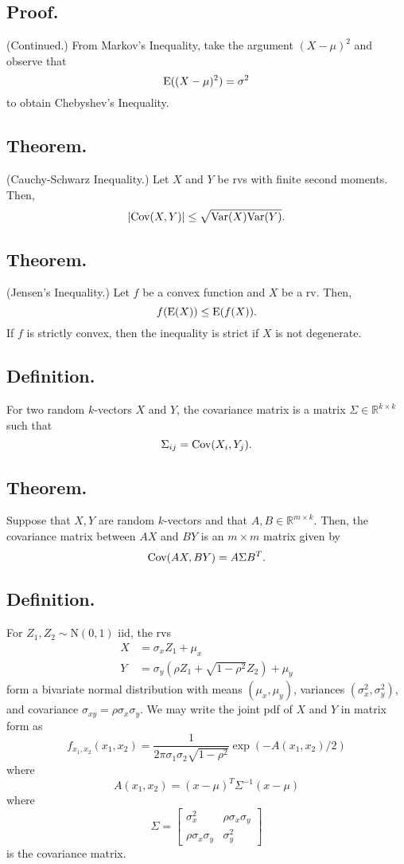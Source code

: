 \documentclass[titlepage]{article}
\begin{document}
\subsection{Proof.} (Continued.) From Markov's Inequality, take the argument $(X - \mu)^{2}$ and observe that 
$$\text{E}((X - \mu)^{2}) = \sigma^{2}$$
to obtain Chebyshev's Inequality.

\subsection{Theorem.} (Cauchy-Schwarz Inequality.) Let $X$ and $Y$ be rvs with finite second moments. Then,
$$|\text{Cov}(X, Y)| \leq \sqrt{\text{Var}(X)\text{Var}(Y)}.$$

\subsection{Theorem.} (Jensen's Inequality.) Let $f$ be a convex function and $X$ be a rv. Then,
$$f(\text{E}(X)) \leq \text{E}(f(X)).$$
If $f$ is strictly convex, then the inequality is strict if $X$ is not degenerate.

\subsection{Definition.} For two random $k$-vectors $X$ and $Y$, the covariance matrix is a matrix $\Sigma \in \mathbb{R}^{k \times k}$ such that
$$\Sigma_{ij} = \text{Cov}(X_{i}, Y_{j}).$$

\subsection{Theorem.} Suppose that $X,Y$ are random $k$-vectors and that $A, B \in \mathbb{R}^{m \times k}$. Then, the covariance matrix between $AX$ and $BY$ is an $m \times m$ matrix given by 
$$\text{Cov}(AX, BY) = A\Sigma B^{T}.$$

\subsection{Definition.} For $Z_{1}, Z_{2} \sim \text{N}(0, 1)$ iid, the rvs
\begin{align*}
    X &= \sigma_{x}Z_{1} + \mu_{x} \\
    Y &= \sigma_{y}(\rho Z_{1} + \sqrt{1 - \rho^{2}}Z_{2}) + \mu_{y}
\end{align*}
form a bivariate normal distribution with means $(\mu_{x}, \mu_{y})$, variances $(\sigma_{x}^{2}, \sigma_{y}^{2})$, and covariance $\sigma_{xy} = \rho\sigma_{x}\sigma_{y}$. We may write the joint pdf of $X$ and $Y$ in matrix form as 
$$f_{x_{1},x_{2}}(x_{1}, x_{2}) = \frac{1}{2\pi\sigma_{1}\sigma_{2}\sqrt{1-\rho^{2}}}\exp(-A(x_{1}, x_{2})/2)$$
where 
$$A(x_{1}, x_{2}) = (x-\mu)^{T}\Sigma^{-1}(x-\mu)$$
where 
$$\Sigma = \begin{bmatrix} \sigma_{x}^{2} & \rho\sigma_{x}\sigma_{y} \\ \rho\sigma_{x}\sigma_{y} & \sigma_{y}^{2} \end{bmatrix}$$
is the covariance matrix.
\end{document}
